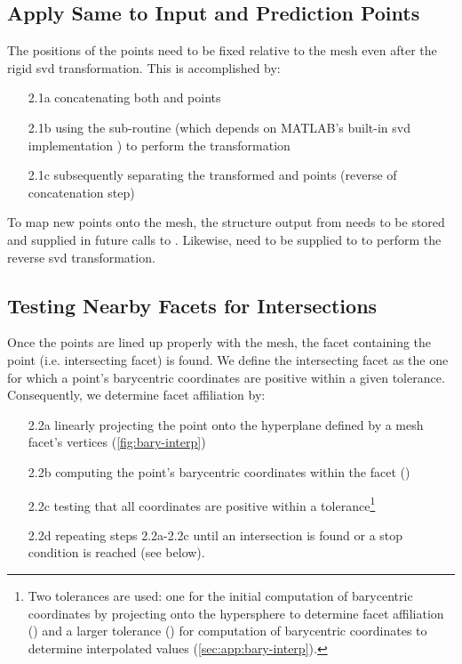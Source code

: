 \documentclass[final,12pt]{elsarticle}
\begin{document}
\subsection{Apply Same  to Input and Prediction Points}
\label{sec:app:bary:int:out-svd}
The positions of the \outpt{} points need to be fixed relative to the mesh even after the rigid \gls{svd} transformation. %
This is accomplished by:
\begin{itemize}%
	\item[2.1a] concatenating both \inpt{} and
	\outpt{} points
	\item[2.1b] using the  sub-routine  (which depends on MATLAB's built-in \gls{svd} implementation ) to perform the transformation
	\item[2.1c] subsequently separating the transformed \inpt{} and \outpt{} points (reverse of concatenation step)
\end{itemize}

To map new points onto the mesh, the  structure output from  needs to be stored and supplied in future calls to . Likewise,  need to be supplied to  to perform the reverse \gls{svd} transformation.

\subsection{Testing Nearby Facets for Intersections}
\label{sec:app:bary:int:facets}
Once the \outpt{} points are lined up properly with the mesh, the facet containing the \outpt{} point (i.e. intersecting facet) is found. We define the intersecting facet as the one for which a point's barycentric coordinates are positive within a given tolerance. Consequently, we determine facet affiliation by:
\begin{enumerate}%
	\item[2.2a] linearly projecting the \outpt{} point onto the hyperplane defined by a mesh facet's vertices (\cref{fig:bary-interp})
	\item[2.2b] computing the point's barycentric coordinates within the facet \cite{anatoliyCheckIfRay2015,skalaRobustBarycentricCoordinates2013} ()
	\item[2.2c] testing that all coordinates are positive \cite{langerSphericalBarycentricCoordinates2006} within a tolerance\footnote{Two tolerances are used: one for the initial computation of barycentric coordinates by projecting onto the hypersphere to determine facet affiliation () and a larger tolerance () for computation of barycentric coordinates to determine interpolated values (\cref{sec:app:bary-interp}). }
	\item[2.2d] repeating steps 2.2a-2.2c until an intersection is found or a stop condition is reached (see  below).
\end{enumerate}
\end{document}
